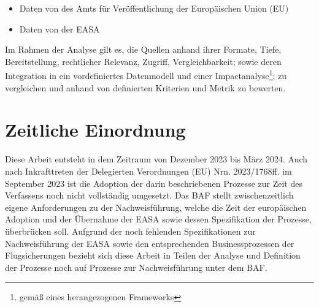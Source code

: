     \begin{itemize}
        \item Daten von des Amts für Veröffentlichung der Europäischen Union (\acs{EU})
        \item Daten von der \ac{EASA}
    \end{itemize}

    Im Rahmen der Analyse gilt es, die Quellen anhand ihrer Formate, Tiefe, Bereitstellung, rechtlicher Relevanz, Zugriff, Vergleichbarkeit; sowie deren Integration in ein vordefiniertes Datenmodell und einer Impactanalyse\footnote{gemäß eines herangezogenen Frameworks}; zu vergleichen und anhand von definierten Kriterien und Metrik zu bewerten.

    
\section{Zeitliche Einordnung}

    Diese Arbeit entsteht in dem Zeitraum von Dezember 2023 bis März 2024.
    Auch nach Inkrafttreten der Delegierten Verordnungen (\ac{EU}) Nrn. 2023/1768ff. im September 2023 ist die Adoption der darin beschriebenen Prozesse zur Zeit des Verfassens noch nicht vollständig umgesetzt. 
    Das \ac{BAF} stellt zwischenzeitlich eigene Anforderungen zu der Nachweisführung, welche die Zeit der europäischen Adoption und der Übernahme der \ac{EASA} sowie dessen Spezifikation der Prozesse, überbrücken soll.
    Aufgrund der noch fehlenden Spezifikationen zur Nachweisführung der \ac{EASA} sowie den entsprechenden Businessprozessen der Flugsicherungen bezieht sich diese Arbeit in Teilen der Analyse und Definition der Prozesse noch auf Prozesse zur Nachweisführung unter dem \ac{BAF}. 
